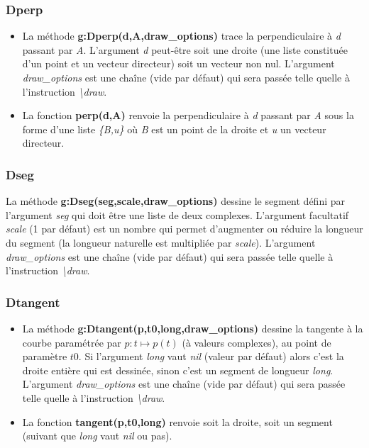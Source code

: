 \documentclass[%
10pt,%
a4paper,%
french,%
]%
{article}%
\begin{document}
\subsubsection{Dperp}
\begin{itemize}
    \item La méthode \textbf{g:Dperp(d,A,draw\_options)} trace la perpendiculaire à \emph{d} passant par \emph{A}. L'argument \emph{d} peut-être soit une droite (une liste constituée d'un point et un vecteur directeur) soit un vecteur non nul. L'argument \emph{draw\_options} est une chaîne (vide par défaut) qui sera passée  telle quelle à l'instruction \emph{\textbackslash draw}.
    \item La fonction \textbf{perp(d,A)} renvoie la perpendiculaire à \emph{d} passant par \emph{A} sous la forme d'une liste \emph{\{B,u\}} où \emph{B} est un point de la droite et \emph{u} un vecteur directeur.
\end{itemize}

\subsubsection{Dseg}
La méthode \textbf{g:Dseg(seg,scale,draw\_options)} dessine le segment défini par l'argument \emph{seg} qui doit être une liste de deux complexes. L'argument facultatif \emph{scale} (1 par défaut) est un nombre qui permet d'augmenter ou réduire la longueur du segment (la longueur naturelle est multipliée par \emph{scale}). L'argument \emph{draw\_options} est une chaîne (vide par défaut) qui sera passée telle quelle à l'instruction \emph{\textbackslash draw}.

\subsubsection{Dtangent}
\begin{itemize}
    \item La méthode \textbf{g:Dtangent(p,t0,long,draw\_options)} dessine la tangente à la courbe paramétrée par \(p: t \mapsto p(t)\) (à valeurs complexes), au point de paramètre \(t0\). Si l'argument \emph{long} vaut \emph{nil} (valeur par défaut) alors c'est la droite entière qui est dessinée, sinon c'est un segment de longueur \emph{long}. L'argument \emph{draw\_options} est une chaîne (vide par défaut) qui sera passée telle quelle à l'instruction \emph{\textbackslash draw}.
    \item La fonction \textbf{tangent(p,t0,long)} renvoie soit la droite, soit un segment (suivant que \emph{long} vaut \emph{nil} ou pas).
\end{itemize}
\end{document}
